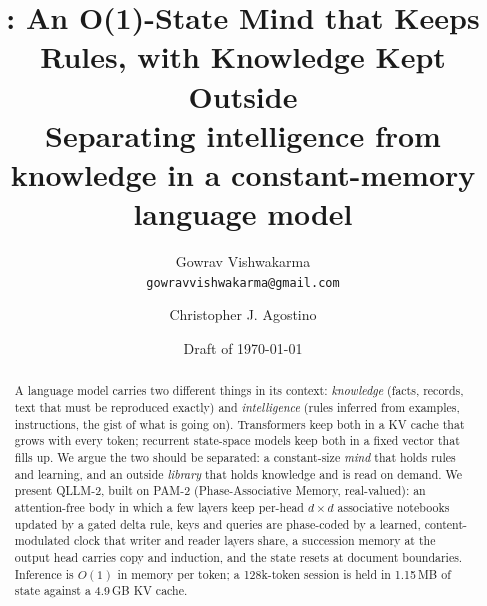 \documentclass[11pt]{article}
\title{\textbf{\model: An O(1)-State Mind that Keeps Rules, with Knowledge Kept Outside}\\[4pt]
\large Separating intelligence from knowledge in a constant-memory language model}
\author{Gowrav Vishwakarma \\ \small \texttt{gowravvishwakarma@gmail.com} \and Christopher J. Agostino}
\date{Draft of \today}
\newcommand{\model}{QLLM-2}
\newcommand{\arch}{PAM-2}
\newcommand{\archlong}{Phase-Associative Memory, real-valued}
\begin{document}
\maketitle

\begin{abstract}
A language model carries two different things in its context: \emph{knowledge} (facts, records, text that must be reproduced exactly) and \emph{intelligence} (rules inferred from examples, instructions, the gist of what is going on). Transformers keep both in a KV cache that grows with every token; recurrent state-space models keep both in a fixed vector that fills up. We argue the two should be separated: a constant-size \emph{mind} that holds rules and learning, and an outside \emph{library} that holds knowledge and is read on demand. We present \model, built on \arch{} (\archlong): an attention-free body in which a few layers keep per-head $d\times d$ associative notebooks updated by a gated delta rule, keys and queries are phase-coded by a learned, content-modulated clock that writer and reader layers share, a succession memory at the output head carries copy and induction, and the state resets at document boundaries. Inference is $O(1)$ in memory per token; a 128k-token session is held in 1.15\,MB of state against a 4.9\,GB KV cache.

\end{abstract}
\end{document}
